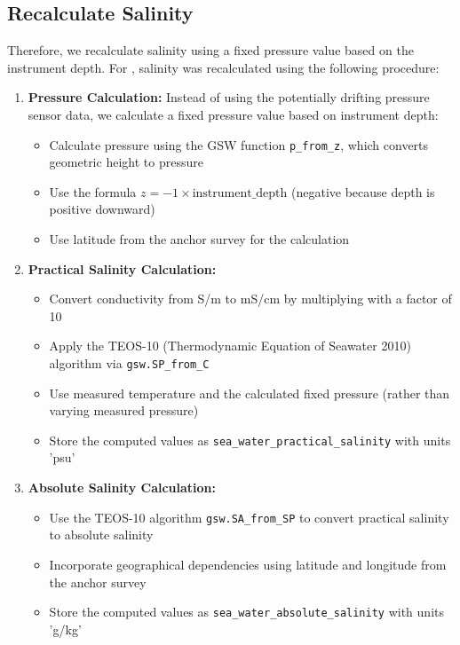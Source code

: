 \subsection{Recalculate Salinity}
Therefore, we recalculate salinity using a fixed pressure value based on the instrument depth.
For \displayprojectname{} \casenumber{}, salinity was recalculated using the following procedure:

\begin{enumerate}
    \item \textbf{Pressure Calculation:} Instead of using the potentially drifting pressure sensor data, we calculate a fixed pressure value based on instrument depth:
    \begin{itemize}
        \item Calculate pressure using the GSW function \texttt{p\_from\_z}, which converts geometric height to pressure
        \item Use the formula $z = -1 \times \text{instrument\_depth}$ (negative because depth is positive downward)
        \item Use latitude from the anchor survey for the calculation
    \end{itemize}
    
    \item \textbf{Practical Salinity Calculation:}
    \begin{itemize}
        \item Convert conductivity from S/m to mS/cm by multiplying with a factor of 10
        \item Apply the TEOS-10 (Thermodynamic Equation of Seawater 2010) algorithm via \texttt{gsw.SP\_from\_C}
        \item Use measured temperature and the calculated fixed pressure (rather than varying measured pressure)
        \item Store the computed values as \texttt{sea\_water\_practical\_salinity} with units 'psu'
    \end{itemize}
    
    \item \textbf{Absolute Salinity Calculation:}
    \begin{itemize}
        \item Use the TEOS-10 algorithm \texttt{gsw.SA\_from\_SP} to convert practical salinity to absolute salinity
        \item Incorporate geographical dependencies using latitude and longitude from the anchor survey
        \item Store the computed values as \texttt{sea\_water\_absolute\_salinity} with units 'g/kg'
    \end{itemize}
    

\end{enumerate}
